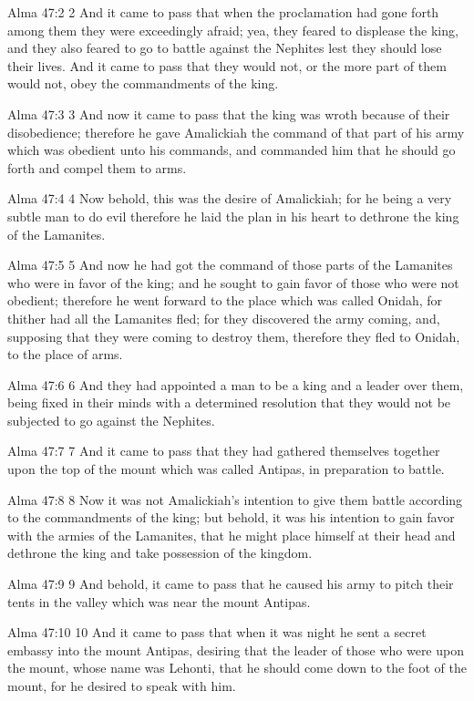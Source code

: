 Alma 47:2
 2 And it came to pass that when the proclamation had gone forth
among them they were exceedingly afraid; yea, they feared to
displease the king, and they also feared to go to battle against
the Nephites lest they should lose their lives. And it came to
pass that they would not, or the more part of them would not,
obey the commandments of the king.

Alma 47:3
 3 And now it came to pass that the king was wroth because of
their disobedience; therefore he gave Amalickiah the command of
that part of his army which was obedient unto his commands, and
commanded him that he should go forth and compel them to arms.

Alma 47:4
 4 Now behold, this was the desire of Amalickiah; for he being a
very subtle man to do evil therefore he laid the plan in his
heart to dethrone the king of the Lamanites.

Alma 47:5
 5 And now he had got the command of those parts of the Lamanites
who were in favor of the king; and he sought to gain favor of
those who were not obedient; therefore he went forward to the
place which was called Onidah, for thither had all the Lamanites
fled; for they discovered the army coming, and, supposing that
they were coming to destroy them, therefore they fled to Onidah,
to the place of arms.

Alma 47:6
 6 And they had appointed a man to be a king and a leader over
them, being fixed in their minds with a determined resolution
that they would not be subjected to go against the Nephites.

Alma 47:7
 7 And it came to pass that they had gathered themselves together
upon the top of the mount which was called Antipas, in
preparation to battle.

Alma 47:8
 8 Now it was not Amalickiah's intention to give them battle
according to the commandments of the king; but behold, it was his
intention to gain favor with the armies of the Lamanites, that he
might place himself at their head and dethrone the king and take
possession of the kingdom.

Alma 47:9
 9 And behold, it came to pass that he caused his army to pitch
their tents in the valley which was near the mount Antipas.

Alma 47:10
 10 And it came to pass that when it was night he sent a secret
embassy into the mount Antipas, desiring that the leader of those
who were upon the mount, whose name was Lehonti, that he should
come down to the foot of the mount, for he desired to speak with
him.

